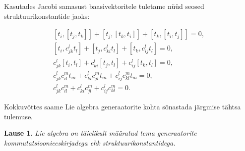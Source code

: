 \documentclass[12pt,a4paper,oneside]{article}
\theoremstyle{plain}
\newtheorem{lause}{Lause}[section]
\theoremstyle{definition}
\numberwithin{equation}{section}
\begin{document}
Kasutades Jacobi samasust baasivektoritele tuletame nüüd seosed 
struktuurikonstantide jaoks:

\begin{align*}
\left[t_i, \left[t_j, t_k\right]\right] + 
	\left[t_j, \left[t_k, t_i\right]\right] + 
	\left[t_k, \left[t_i, t_j\right]\right] = 0, \\
\left[t_i, c_{jk}^{l}t_l\right] + 
	\left[t_j, c_{ki}^{l}t_l\right] + 
	\left[t_k, c_{ij}^{l}t_l\right] = 0, \\
c_{jk}^{l} \left[t_i, t_l\right] + 
	c_{ki}^{l} \left[t_j, t_l\right] + 
	c_{ij}^{l} \left[t_k, t_l\right] = 0, \\
c_{jk}^{l} c_{il}^{m} t_m + 
	c_{ki}^{l} c_{jl}^{m} t_m + 
	c_{ij}^{l} c_{kl}^{m} t_m = 0, \\
c_{jk}^{l} c_{il}^{m} + c_{ki}^{l} c_{jl}^{m} + 
	c_{ij}^{l} c_{kl}^{m} = 0.
\end{align*}

Kokkuvõttes saame Lie algebra generaatorite kohta sõnastada järgmise 
tähtsa tulemuse.
\begin{lause}
Lie algebra on täielikult määratud tema generaatorite 
kommutatsiooni\-eeskirjadega ehk struktuurikonstantidega.
\end{lause}
\end{document}
